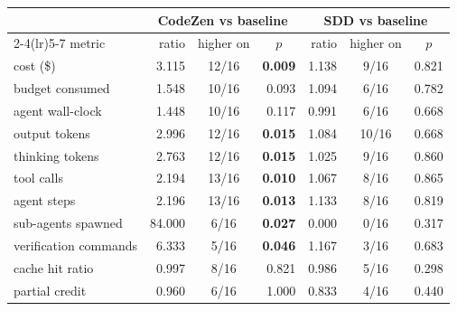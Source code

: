 
\begin{tabular}{@{}lrcrrcr@{}}
\toprule
 & \multicolumn{3}{c}{CodeZen vs baseline} & \multicolumn{3}{c}{SDD vs baseline} \\
\cmidrule(lr){2-4}\cmidrule(lr){5-7}
metric & ratio & higher on & \multicolumn{1}{c}{$p$} & ratio & higher on & \multicolumn{1}{c}{$p$} \\
\midrule
cost (\$) & 3.115 & 12/16 & \textbf{0.009} & 1.138 & 9/16 & 0.821 \\
budget consumed & 1.548 & 10/16 & 0.093 & 1.094 & 6/16 & 0.782 \\
agent wall-clock & 1.448 & 10/16 & 0.117 & 0.991 & 6/16 & 0.668 \\
output tokens & 2.996 & 12/16 & \textbf{0.015} & 1.084 & 10/16 & 0.668 \\
thinking tokens & 2.763 & 12/16 & \textbf{0.015} & 1.025 & 9/16 & 0.860 \\
tool calls & 2.194 & 13/16 & \textbf{0.010} & 1.067 & 8/16 & 0.865 \\
agent steps & 2.196 & 13/16 & \textbf{0.013} & 1.133 & 8/16 & 0.819 \\
sub-agents spawned & 84.000 & 6/16 & \textbf{0.027} & 0.000 & 0/16 & 0.317 \\
verification commands & 6.333 & 5/16 & \textbf{0.046} & 1.167 & 3/16 & 0.683 \\
cache hit ratio & 0.997 & 8/16 & 0.821 & 0.986 & 5/16 & 0.298 \\
partial credit & 0.960 & 6/16 & 1.000 & 0.833 & 4/16 & 0.440 \\
\bottomrule
\end{tabular}

